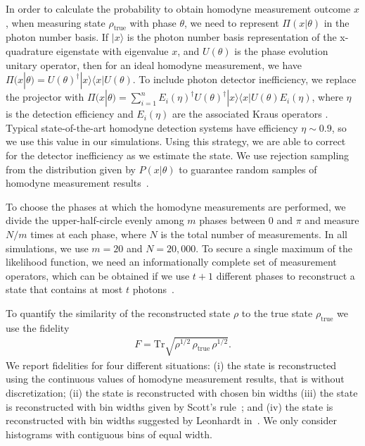 \documentclass[
reprint,
superscriptaddress,
showpacs,
amsmath,
amssymb,
aps,
pra,
longbibliography
]{revtex4-1}
\newcommand{\rhotrue}{\rho_{\text{true}}}
\begin{document}
In order to calculate the probability to obtain homodyne measurement
outcome $x$, when measuring state $\rho_{\mathrm{true}}$ with phase
$\theta$, we need to represent $\Pi (x|\theta)$ in the
photon number basis. If $|x\rangle$ is the photon number basis
representation of the x-quadrature eigenstate with eigenvalue $x$, and
$U(\theta)$ is the phase evolution unitary operator, then for an ideal
homodyne measurement, we have
$\Pi(x|\theta) = U(\theta)^{\dagger} |x\rangle \langle x|
U(\theta)$. To include photon
detector inefficiency, we replace the projector with
$\Pi(x|\theta) = \sum_{i=1}^{n} E_i(\eta)^{\dagger}
U(\theta)^{\dagger} |x\rangle \langle x| U(\theta) E_i(\eta)$, where
$\eta$ is the detection efficiency and $E_i(\eta)$ are the
  associated Kraus operators \cite{Lvovsky2004}.  Typical
state-of-the-art homodyne detection systems have efficiency
$\eta \sim 0.9$, so we use this value in our simulations. Using this
strategy, we are able to correct for the detector
  inefficiency as we estimate the state. We use rejection sampling
from the distribution given by $P(x|\theta)$ to guarantee random
samples of homodyne measurement results~\cite{Kennedy1980}.

To choose the phases at which the homodyne measurements are performed,
we divide the upper-half-circle evenly among $m$ phases between 0 and
$\pi$ and measure $N/m$ times at each phase, where $N$ is the total
number of measurements. In all simulations, we use $m=20$ and
$N = 20,000$. To secure a single maximum of the likelihood function,
we need an informationally complete set of measurement operators,
which can be obtained if we use $t+1$ different phases to reconstruct
a state that contains at most $t$ photons~\cite{Leonhardt1997}.

To quantify the similarity of the reconstructed state $\rho$ to the
true state $\rhotrue$ we use the fidelity
\begin{eqnarray}
  F = \mathrm{Tr} \sqrt{\rho^{1/2}\, \rhotrue \, \rho^{1/2}}.
\end{eqnarray}
We report fidelities for four different
situations: (i) the state is reconstructed using the continuous values
of homodyne measurement results, that is without discretization; (ii)
the state is reconstructed with chosen bin widths (iii) the state is
reconstructed with bin widths given by Scott's rule~\cite{Scott2010};
and (iv) the state is reconstructed with bin widths suggested by
Leonhardt in~\cite{Leonhardt1997}. We only consider histograms with
contiguous bins of equal width.
\end{document}
